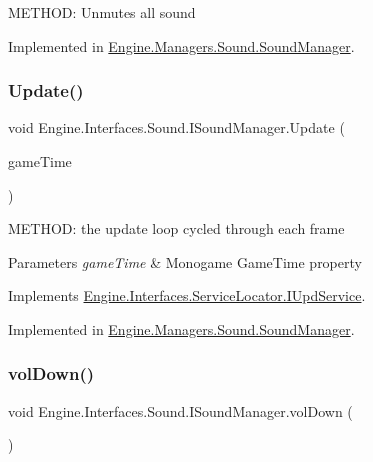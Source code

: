 M\+E\+T\+H\+OD\+: Unmutes all sound 



Implemented in \hyperlink{a00546_ad62eb34a308bfe457bc7229045a66af0}{Engine.\+Managers.\+Sound.\+Sound\+Manager}.

\mbox{\label{a00482_af7ddcb52a6283aa2cf4392c75d2a0cff}} 
\subsubsection{\texorpdfstring{Update()}{Update()}}
{\footnotesize\ttfamily void Engine.\+Interfaces.\+Sound.\+I\+Sound\+Manager.\+Update (\begin{DoxyParamCaption}\item[{Game\+Time}]{game\+Time }\end{DoxyParamCaption})}



M\+E\+T\+H\+OD\+: the update loop cycled through each frame 


\begin{DoxyParams}{Parameters}
{\em game\+Time} & Monogame Game\+Time property\\
\hline
\end{DoxyParams}


Implements \hyperlink{a00478_a387fce2a5440a4dc63f8d72772ecbdaa}{Engine.\+Interfaces.\+Service\+Locator.\+I\+Upd\+Service}.



Implemented in \hyperlink{a00546_a43e47a47daa91f3b1d0f38b3dcb0323e}{Engine.\+Managers.\+Sound.\+Sound\+Manager}.

\mbox{\label{a00482_a96629b32d608ca84fe1a3624bece7f05}} 
\subsubsection{\texorpdfstring{vol\+Down()}{volDown()}}
{\footnotesize\ttfamily void Engine.\+Interfaces.\+Sound.\+I\+Sound\+Manager.\+vol\+Down (\begin{DoxyParamCaption}{ }\end{DoxyParamCaption})}



